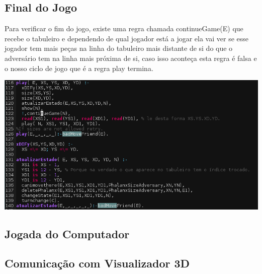 \documentclass[a4paper]{article}
\begin{document}
\subsection{Final do Jogo}
Para verificar o fim do jogo, existe uma regra chamada continueGame(E) que recebe o tabuleiro e dependendo de qual jogador está a jogar ela vai ver se esse jogador tem mais peças na linha do tabuleiro mais distante de si do que o adversário tem na linha mais próxima de si, caso isso aconteça esta regra é falsa e o nosso ciclo de jogo que é a regra play termina.

\begin{center}
\includegraphics[scale=0.50]{jjj.png}
\end{center}

\subsection{Jogada do Computador}

\subsection{Comunicação com Visualizador 3D}
\end{document}
